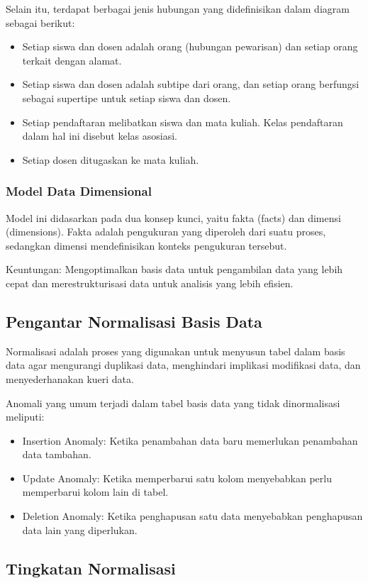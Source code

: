 \documentclass{article}
\begin{document}
Selain itu, terdapat berbagai jenis hubungan yang didefinisikan dalam diagram sebagai berikut:
\begin{itemize}
    \item Setiap siswa dan dosen adalah orang (hubungan pewarisan) dan setiap orang terkait dengan alamat.
    \item Setiap siswa dan dosen adalah subtipe dari orang, dan setiap orang berfungsi sebagai supertipe untuk setiap siswa dan dosen.
    \item Setiap pendaftaran melibatkan siswa dan mata kuliah. Kelas pendaftaran dalam hal ini disebut kelas asosiasi.
    \item Setiap dosen ditugaskan ke mata kuliah.
\end{itemize}

\subsubsection{Model Data Dimensional}
Model ini didasarkan pada dua konsep kunci, yaitu fakta (facts) dan dimensi (dimensions). Fakta adalah pengukuran yang diperoleh dari suatu proses, sedangkan dimensi mendefinisikan konteks pengukuran tersebut.

Keuntungan: Mengoptimalkan basis data untuk pengambilan data yang lebih cepat dan merestrukturisasi data untuk analisis yang lebih efisien.

\subsection{Pengantar Normalisasi Basis Data}
Normalisasi adalah proses yang digunakan untuk menyusun tabel dalam basis data agar mengurangi duplikasi data, menghindari implikasi modifikasi data, dan menyederhanakan kueri data.

Anomali yang umum terjadi dalam tabel basis data yang tidak dinormalisasi meliputi:
\begin{itemize}
    \item Insertion Anomaly: Ketika penambahan data baru memerlukan penambahan data tambahan.
    \item Update Anomaly: Ketika memperbarui satu kolom menyebabkan perlu memperbarui kolom lain di tabel.
    \item Deletion Anomaly: Ketika penghapusan satu data menyebabkan penghapusan data lain yang diperlukan.
\end{itemize}

\subsection{Tingkatan Normalisasi}
\end{document}
